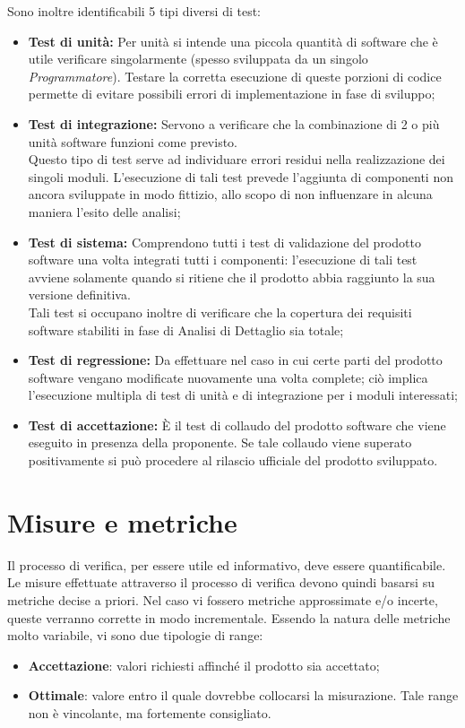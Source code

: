 \begin{itemize}
Sono inoltre identificabili 5 tipi diversi di test:
\begin{itemize}
	\item \textbf{Test di unità:} Per unità si intende una piccola quantità di software che è utile verificare singolarmente (spesso sviluppata da un singolo \textit{Programmatore}).
	Testare la corretta esecuzione di queste porzioni di codice permette di evitare possibili errori di implementazione in fase di sviluppo; 
	\item \textbf{Test di integrazione:} Servono a verificare che la combinazione di 2 o più unità
	software funzioni come previsto. \\
	Questo tipo di test serve ad individuare errori residui nella realizzazione dei singoli
	moduli.
	L'esecuzione di tali test prevede l'aggiunta di componenti non ancora sviluppate in modo fittizio, allo scopo di non influenzare in alcuna maniera l'esito delle analisi;
	\item \textbf{Test di sistema:} Comprendono tutti i test di validazione del prodotto software una volta integrati tutti i componenti: l'esecuzione 
	di tali test avviene solamente quando si ritiene che il prodotto abbia raggiunto la sua versione definitiva.\\
	Tali test si occupano inoltre di verificare che la copertura dei requisiti software stabiliti in fase di Analisi
	di Dettaglio sia totale;
	\item \textbf{Test di regressione:} Da effettuare nel caso in cui certe parti del prodotto software vengano modificate nuovamente una volta complete; ciò implica l'esecuzione multipla di test di unità e di integrazione per i moduli interessati;
	\item \textbf{Test di accettazione:} È il test di collaudo del prodotto software che viene eseguito in presenza della proponente.
	Se tale collaudo viene superato positivamente si può procedere al rilascio ufficiale del
	prodotto sviluppato.
\end{itemize}
	
\end{itemize}	
\chapter{Misure e metriche}\label{Metriche}
Il processo di verifica, per essere utile ed informativo, deve essere quantificabile. Le misure effettuate attraverso il processo di verifica devono quindi basarsi su metriche decise a priori.
Nel caso vi fossero metriche approssimate e/o incerte, queste verranno corrette in modo incrementale.
Essendo la natura delle metriche molto variabile, vi sono due tipologie di range:
\begin{itemize}
	\item \textbf{Accettazione}: valori richiesti affinché  il prodotto sia accettato;
	\item \textbf{Ottimale}: valore entro il quale dovrebbe collocarsi la misurazione. Tale range non è vincolante, ma fortemente consigliato.
\end{itemize}
